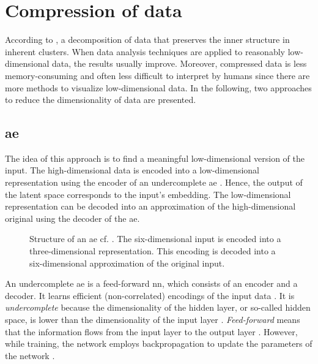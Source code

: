 \section{Compression of data}\label{sec:compression}

According to \citeauthor{clusteringDocs2020}, a decomposition of data that preserves the inner structure in inherent clusters. 
When data analysis techniques are applied to reasonably low-dimensional data, the results usually improve.
Moreover, compressed data is less memory-consuming and often less difficult to interpret by humans 
since there are more methods to visualize low-dimensional data.
In the following, two approaches to reduce the dimensionality of data are presented.

\subsection{\acl*{ae}}\label{subsec:autoencoder}

The idea of this approach is to find a meaningful low-dimensional version of the input.
The high-dimensional data is encoded into a low-dimensional representation using the encoder of an undercomplete \ac{ae} \cite{autoencoder2020}.
Hence, the output of the latent space corresponds to the input's embedding. 
The low-dimensional representation can be decoded into an approximation of the high-dimensional original using the decoder of the \ac{ae}.

\begin{figure}[!htb] %
    \centering
    
    \caption[Structure of an \ac{ae}]
    {Structure of an \ac{ae} cf. \cite{autoencoder2020}.
    The six-dimensional input is encoded into a three-dimensional representation.
    This encoding is decoded into a six-dimensional approximation of the original input.}
    \label{fig:ae}
\end{figure}

An undercomplete \ac{ae} is a feed-forward \ac{nn}, which consists of an encoder and a decoder.
It learns efficient (non-correlated) encodings of the input data \cite{autoencoder2020}.
It is \textit{undercomplete} because the dimensionality of the hidden layer, or so-called hidden space, 
is lower than the dimensionality of the input layer \cite{seminar_ies}.
\textit{Feed-forward} means that the information flows from the input layer to the output layer \cite{seminar_ies}.
However, while training, the network employs backpropagation to update the parameters of the network \cite{seminar_ies}.

